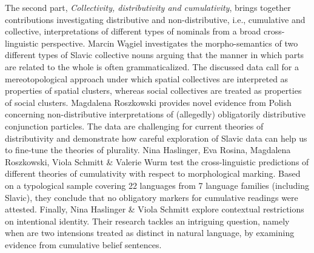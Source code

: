 \documentclass[output=paper]{langscibook}
\begin{document}
The second part, \textit{Collectivity, distributivity and cumulativity}, brings together contributions investigating distributive and non-distributive, i.e., cumulative and collective, interpretations of different types of nominals from a broad cross-lin\-guistic perspective. Marcin Wągiel investigates the morpho-semantics of two different types of Slavic collective nouns arguing that the manner in which parts are related to the whole is often grammaticalized. The discussed data call for a mereoto\-pological approach under which spatial collectives are interpreted as properties of spatial clusters, whereas social collectives are treated as properties of social clusters. Magdalena Roszkowski provides novel evidence from Polish concerning non-distributive interpretations of (allegedly) obligatorily distributive conjunction particles. The data are challenging for current theories of distributivity and demonstrate how careful exploration of Slavic data can help us to fine-tune the theories of plurality. Nina Haslinger, Eva Rosina, Magdalena Rosz\-kow\-ski, Viola Schmitt \& Valerie Wurm test the cross-linguistic predictions of different theories of cumulativity with respect to morphological marking. Based on a typological sample covering 22 languages from 7 language families (including Slavic), they conclude that no obligatory markers for cumulative readings were attested. Finally, Nina Haslinger \& Viola Schmitt explore contextual restrictions on intentional identity. Their research tackles an intriguing question, namely when are two intensions treated as distinct in natural language, by examining evidence from cumulative belief sentences.
\end{document}
